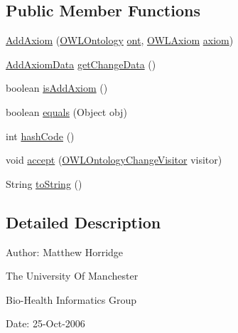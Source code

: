 \subsection*{Public Member Functions}
\begin{DoxyCompactItemize}
\item 
\hyperlink{classorg_1_1semanticweb_1_1owlapi_1_1model_1_1_add_axiom_a4b9ea38ec0bf3f121189d7ce03f99a35}{Add\-Axiom} (\hyperlink{interfaceorg_1_1semanticweb_1_1owlapi_1_1model_1_1_o_w_l_ontology}{O\-W\-L\-Ontology} \hyperlink{classorg_1_1semanticweb_1_1owlapi_1_1model_1_1_o_w_l_ontology_change_a9b8b64f1cab33aae500db20e19186211}{ont}, \hyperlink{interfaceorg_1_1semanticweb_1_1owlapi_1_1model_1_1_o_w_l_axiom}{O\-W\-L\-Axiom} \hyperlink{classorg_1_1semanticweb_1_1owlapi_1_1model_1_1_o_w_l_axiom_change_a83ce115af103f6cb9ce7598780a296dc}{axiom})
\item 
\hyperlink{classorg_1_1semanticweb_1_1owlapi_1_1change_1_1_add_axiom_data}{Add\-Axiom\-Data} \hyperlink{classorg_1_1semanticweb_1_1owlapi_1_1model_1_1_add_axiom_ab7d02da872d6b115af929fe650f513d5}{get\-Change\-Data} ()
\item 
boolean \hyperlink{classorg_1_1semanticweb_1_1owlapi_1_1model_1_1_add_axiom_ad2ea891ba8c0af6d001cb161c9d9a4fd}{is\-Add\-Axiom} ()
\item 
boolean \hyperlink{classorg_1_1semanticweb_1_1owlapi_1_1model_1_1_add_axiom_ae471dac6766492aa065cd3def9e7173a}{equals} (Object obj)
\item 
int \hyperlink{classorg_1_1semanticweb_1_1owlapi_1_1model_1_1_add_axiom_a0b3db936c60ff8b222351b6066351f0c}{hash\-Code} ()
\item 
void \hyperlink{classorg_1_1semanticweb_1_1owlapi_1_1model_1_1_add_axiom_a17de76a887bb7900c6e58a15859288bb}{accept} (\hyperlink{interfaceorg_1_1semanticweb_1_1owlapi_1_1model_1_1_o_w_l_ontology_change_visitor}{O\-W\-L\-Ontology\-Change\-Visitor} visitor)
\item 
String \hyperlink{classorg_1_1semanticweb_1_1owlapi_1_1model_1_1_add_axiom_a92199f97def11567f61663bd51f975e9}{to\-String} ()
\end{DoxyCompactItemize}


\subsection{Detailed Description}
Author\-: Matthew Horridge\par
 The University Of Manchester\par
 Bio-\/\-Health Informatics Group\par
 Date\-: 25-\/\-Oct-\/2006\par
\par


